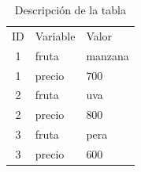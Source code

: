 \documentclass[10pt,]{article}
\begin{document}
\clearpage

\begin{table}[]
\centering
\caption{Descripción de la tabla}
\label{etiqueta_tabla}
\begin{tabular}{cll}
ID & Variable & Valor   \\
1  & fruta    & manzana \\
1  & precio   & 700     \\
2  & fruta    & uva     \\
2  & precio   & 800     \\
3  & fruta    & pera    \\
3  & precio   & 600    
\end{tabular}
\end{table}




\end{document}
